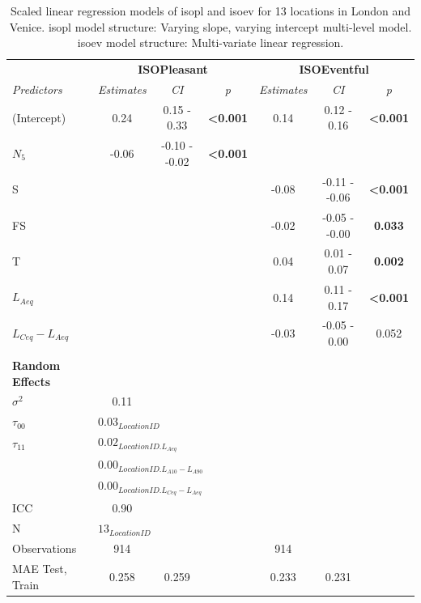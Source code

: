    \begin{table}[h!]
  \centering
\caption{Scaled linear regression models of \gls{isopl} and \gls{isoev} for 13 locations in London and Venice. \gls{isopl} model structure: Varying slope, varying intercept multi-level model. \gls{isoev} model structure: Multi-variate linear regression. \label{tab:scaled-model}}

  \def\arraystretch{.5}
   \begin{tabular}{@{}l|cccccc@{}}
    \toprule
    \multicolumn{1}{l|}{} & \multicolumn{3}{c}{\textbf{ISOPleasant}} & \multicolumn{3}{c}{\textbf{ISOEventful}} \\
    \textit{Predictors} & \textit{Estimates} & \textit{CI} & \textit{p} & \textit{Estimates} & \textit{CI} & \textit{p} \\ \midrule
    (Intercept) & 0.24 & 0.15 - 0.33      & \textbf{\textless{}0.001} & 0.14 & 0.12 - 0.16 & \textbf{\textless{}0.001}  \\
    $N_5$      & -0.06 & -0.10 - -0.02 & \textbf{\textless{}0.001} &    &     & \\
    S          &       &               &     & -0.08 & -0.11 - -0.06 & \textbf{\textless{}0.001} \\
    FS         &       &               &     & -0.02 & -0.05 - -0.00 & \textbf{0.033}  \\
    T          &       &               &     & 0.04  & 0.01 - 0.07   & \textbf{0.002}  \\
    $L_{Aeq}$  &       &               &     & 0.14  & 0.11 - 0.17   & \textbf{\textless{}0.001} \\
    $L_{Ceq}-L_{Aeq}$ &  &             &     & -0.03 & -0.05 - 0.00  & 0.052        \\
    \\
    \textbf{Random Effects} &  &       &     &       &               & \\
    $\sigma^2$  & 0.11  &              &     &       &               & \\
    $\tau_{00}$ & \multicolumn{6}{l}{$0.03_{LocationID}$} \\ 
    $\tau_{11}$ & \multicolumn{6}{l}{$0.02_{LocationID.L_{Aeq}}$}  \\
                & \multicolumn{6}{l}{$0.00_{LocationID.L_{A10}-L_{A90}}$} \\
                & \multicolumn{6}{l}{$0.00_{LocationID.L_{Ceq}-L_{Aeq}}$} \\
    ICC         & 0.90 &               &     &       &               &    \\ \midrule
    N           & \multicolumn{6}{l}{$13_{LocationID}$} \\
    Observations & 914 &               &     & 914   &               &  \\
    MAE Test, Train & 0.258 & 0.259    &     & 0.233 & 0.231 \\
    \bottomrule
  \end{tabular}
\end{table}

